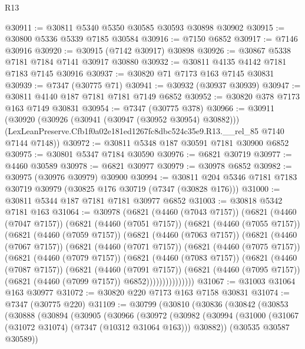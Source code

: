 \begin{lexlean}{R13}
\begin{coremodule}
@30911 := @30811 @5340 @5350 @30585 @30593 @30898 @30902
@30915 := @30800 @5336 @5339 @7185 @30584
@30916 := @7150 @6852
@30917 := @7146 @30916
@30920 := @30915 (@7142 @30917) @30898
@30926 := @30867 @5338 @7181 @7184 @7141 @30917 @30880
@30932 := @30811 @4135 @4142 @7181 @7183 @7145 @30916
@30937 := @30820 @71 @7173 @163 @7145 @30831
@30939 := @7347 (@30775 @71)
@30941 := @30932 (@30937 @30939)
@30947 := @30811 @4140 @187 @7181 @7181 @7149 @6852
@30952 := @30820 @378 @7173 @163 @7149 @30831
@30954 := @7347 (@30775 @378)
@30966 := @30911
    (@30920
      (@30926 (@30941 (@30947 (@30952 @30954) @30882)))
      (LexLeanPreserve.Cfb1f0a02e181ed1267fc8dbc524c35e9.R13.__rel_85 @7140 @7144 @7148))
@30972 := @30811 @5348 @187 @30591 @7181 @30900 @6852
@30975 := @30801 @5347 @7184 @30590
@30976 := @6821 @30719
@30977 := @4460 @30589
@30978 := @6821 @30977
@30979 := @30978 @6852
@30982 := @30975 (@30976 @30979) @30900
@30994 := @30811 @204 @5346 @7181 @7183 @30719 @30979 (@30825 @176 @30719 (@7347 (@30828 @176)))
@31000 := @30811 @5344 @187 @7181 @7181 @30977 @6852
@31003 := @30818 @5342 @7181 @163
@31064 := @30978
    (@6821
      (@4460 (@7043 @7157))
      (@6821
        (@4460 (@7047 @7157))
        (@6821
          (@4460 (@7051 @7157))
          (@6821
            (@4460 (@7055 @7157))
            (@6821
              (@4460 (@7059 @7157))
              (@6821
                (@4460 (@7063 @7157))
                (@6821
                  (@4460 (@7067 @7157))
                  (@6821
                    (@4460 (@7071 @7157))
                    (@6821
                      (@4460 (@7075 @7157))
                      (@6821
                        (@4460 (@7079 @7157))
                        (@6821
                          (@4460 (@7083 @7157))
                          (@6821
                            (@4460 (@7087 @7157))
                            (@6821
                              (@4460 (@7091 @7157))
                              (@6821
                                (@4460 (@7095 @7157))
                                (@6821 (@4460 (@7099 @7157)) @6852)))))))))))))))
@31067 := @31003 @31064 @163 @30977
@31072 := @30820 @220 @7173 @163 @7158 @30831
@31074 := @7347 (@30775 @220)
@31109 := @30799
    (@30810
      (@30836
        (@30842
          (@30853
            (@30888
              (@30894
                (@30905
                  (@30966
                    (@30972
                      (@30982
                        (@30994
                          (@31000 (@31067 (@31072 @31074) (@7347 (@10312 @31064 @163))) @30882))
                        (@30535 @30587 @30589))

\end{coremodule}
\end{lexlean}
